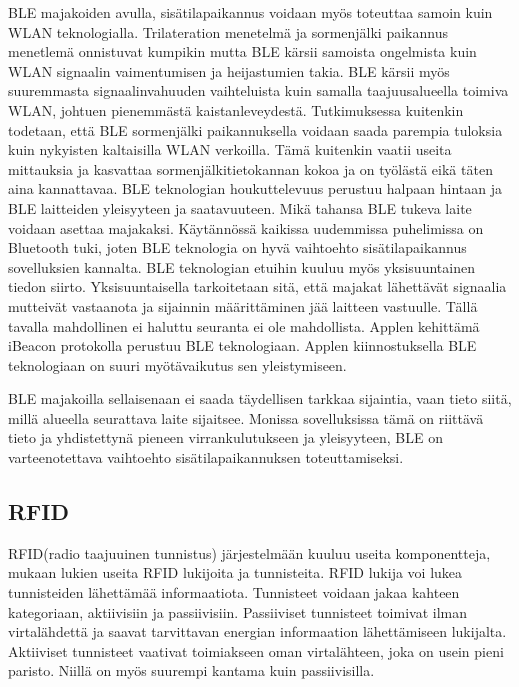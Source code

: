 BLE majakoiden avulla, sisätilapaikannus voidaan myös toteuttaa samoin kuin WLAN teknologialla\cite{BLE}. Trilateration menetelmä ja sormenjälki paikannus menetlemä onnistuvat kumpikin mutta BLE kärsii samoista ongelmista kuin WLAN signaalin vaimentumisen ja heijastumien takia. BLE kärsii myös suuremmasta signaalinvahuuden vaihteluista kuin samalla taajuusalueella toimiva WLAN, johtuen pienemmästä kaistanleveydestä\cite{BLE}. Tutkimuksessa\cite{BLE} kuitenkin todetaan, että BLE sormenjälki paikannuksella voidaan saada parempia tuloksia kuin nykyisten kaltaisilla WLAN verkoilla. Tämä kuitenkin vaatii useita mittauksia ja kasvattaa sormenjälkitietokannan kokoa ja on työlästä eikä täten aina kannattavaa.
BLE teknologian houkuttelevuus perustuu halpaan hintaan ja BLE laitteiden yleisyyteen ja saatavuuteen. Mikä tahansa BLE tukeva laite voidaan asettaa majakaksi.\cite{BLE} Käytännössä kaikissa uudemmissa puhelimissa on Bluetooth tuki, joten BLE teknologia on hyvä vaihtoehto sisätilapaikannus sovelluksien kannalta. BLE teknologian etuihin kuuluu myös yksisuuntainen tiedon siirto. Yksisuuntaisella tarkoitetaan sitä, että majakat lähettävät signaalia mutteivät vastaanota ja sijainnin määrittäminen jää laitteen vastuulle. Tällä tavalla mahdollinen ei haluttu seuranta ei ole mahdollista. Applen kehittämä iBeacon protokolla perustuu BLE teknologiaan\cite{bluesentinel}. Applen kiinnostuksella BLE teknologiaan on suuri myötävaikutus sen yleistymiseen.

BLE majakoilla sellaisenaan ei saada täydellisen tarkkaa sijaintia, vaan tieto siitä, millä alueella seurattava laite sijaitsee. Monissa sovelluksissa tämä on riittävä tieto ja yhdistettynä pieneen virrankulutukseen ja yleisyyteen, BLE on varteenotettava vaihtoehto sisätilapaikannuksen toteuttamiseksi. 
\subsection{RFID}
RFID(radio taajuuinen tunnistus) järjestelmään kuuluu useita komponentteja, mukaan lukien useita RFID lukijoita ja tunnisteita. RFID lukija voi lukea tunnisteiden lähettämää informaatiota. Tunnisteet voidaan jakaa kahteen kategoriaan, aktiivisiin ja passiivisiin. Passiiviset tunnisteet toimivat ilman virtalähdettä ja saavat tarvittavan energian informaation lähettämiseen lukijalta. Aktiiviset tunnisteet vaativat toimiakseen oman virtalähteen, joka on usein pieni paristo. Niillä on myös suurempi kantama kuin passiivisilla.\cite{E}

